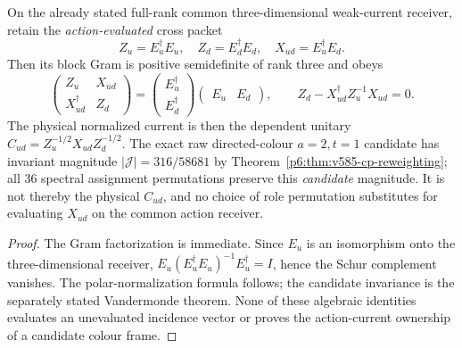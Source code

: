 \documentclass[12pt,a4paper]{article}
\begin{document}
\begin{corollary}
\label{p6:cor:v239-quark-joint-gram}
On the already stated full-rank common three-dimensional weak-current
receiver, retain the \emph{action-evaluated} cross packet
\[
 Z_u=E_u^\dagger E_u,\quad Z_d=E_d^\dagger E_d,
 \quad X_{ud}=E_u^\dagger E_d.
\]
Then its block Gram is positive semidefinite of rank three and obeys
\begin{equation}\label{p6:eq:v239-quark-gram-schur}
 \boxed{\begin{pmatrix}Z_u&X_{ud}\\X_{ud}^\dagger&Z_d\end{pmatrix}
  =\begin{pmatrix}E_u^\dagger\\E_d^\dagger\end{pmatrix}
    \begin{pmatrix}E_u&E_d\end{pmatrix},\qquad
 Z_d-X_{ud}^\dagger Z_u^{-1}X_{ud}=0.}
\end{equation}
The physical normalized current is then the dependent unitary
$C_{ud}=Z_u^{-1/2}X_{ud}Z_d^{-1/2}$. The exact raw directed-colour
$a=2,t=1$ candidate has invariant magnitude
$|\mathcal J|=316/58681$ by
Theorem~\ref{p6:thm:v585-cp-reweighting}; all 36 spectral
assignment permutations preserve this \emph{candidate} magnitude.
It is not thereby the physical $C_{ud}$, and no choice of role
permutation substitutes for evaluating $X_{ud}$ on the common action
receiver.
\end{corollary}
\begin{proof}
The Gram factorization is immediate. Since $E_u$ is an isomorphism
onto the three-dimensional receiver,
$E_u(E_u^\dagger E_u)^{-1}E_u^\dagger=I$, hence the Schur complement
vanishes. The polar-normalization formula follows; the candidate
invariance is the separately stated Vandermonde theorem. None of
these algebraic identities evaluates an unevaluated incidence vector
or proves the action-current ownership of a candidate colour frame.
\end{proof}
\end{document}
